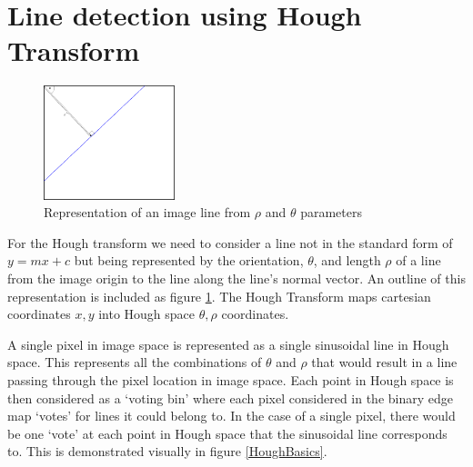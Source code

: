 \documentclass{article}
\begin{document}
	
	\section{Line detection using Hough Transform}
		
	\begin{figure}
		\begin{center}
			\includegraphics[width=0.34\textwidth]{HoughLineSpace}
		\end{center}
		\caption{Representation of an image line from $\rho$ and $\theta$ parameters}
		\label{HoughLineSpace}
	\end{figure}

	For the Hough transform we need to consider a line not in the standard form of $y = mx + c$ but being represented by the orientation, $\theta$, and length $\rho$ of a line from the image origin to the line along the line's normal vector. An outline of this representation is included as figure \ref{HoughLineSpace}. The Hough Transform maps cartesian coordinates $x, y$ into Hough space $\theta , \rho$ coordinates. 
%	

	
	A single pixel in image space is represented as a single sinusoidal line in Hough space. This represents all the combinations of $\theta$ and $\rho$ that would result in a line passing through the pixel location in image space. Each point in Hough space is then considered as a `voting bin' where each pixel considered in the binary edge map `votes' for lines it could belong to. In the case of a single pixel, there would be one `vote' at each point in Hough space that the sinusoidal line corresponds to. This is demonstrated visually in figure \ref{HoughBasics}.
	
\end{document}
